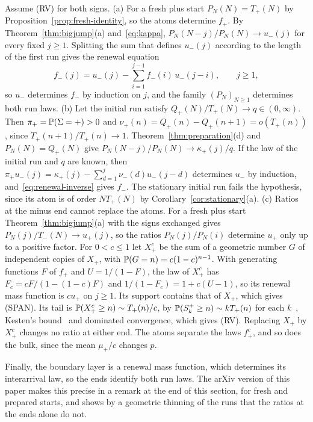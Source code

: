 \begin{remark}\label{thm:inverse}\label{rem:thinning}
Assume (RV) for both signs.
(a) For a fresh plus start $P_N(N)=T_\plus(N)$ by
Proposition~\ref{prop:fresh-identity}, so the atoms determine $f_\plus$. By
Theorem~\ref{thm:bigjump}(a) and~\eqref{eq:kappa}, $P_N(N-j)/P_N(N)\to u_\minus(j)$ for
every fixed $j\ge1$. Splitting the sum that defines $u_\minus(j)$ according to the
length of the first run gives the renewal equation
\begin{equation}\label{eq:renewal-inverse}
 f_\minus(j)=u_\minus(j)-\sum_{i=1}^{j-1}f_\minus(i)\,u_\minus(j-i),\qquad j\ge1,
\end{equation}
so $u_\minus$ determines $f_\minus$ by induction on $j$, and the family $(P_N)_{N\ge1}$
determines both run laws.
(b) Let the initial run satisfy $Q_\plus(N)/T_\plus(N)\to q\in(0,\infty)$. Then
$\pi_{+}=\mathbb{P}(\Sigma={+})>0$ and $\nu_\plus(n)=Q_\plus(n)-Q_\plus(n+1)=o(T_\plus(n))$,
since $T_\plus(n+1)/T_\plus(n)\to1$. Theorem~\ref{thm:preparation}(d) and
$P_N(N)=Q_\plus(N)$ give $P_N(N-j)/P_N(N)\to\kappa_\plus(j)/q$. If the law of the
initial run and $q$ are known, then
$\pi_\plus u_\minus(j)=\kappa_\plus(j)-\sum_{d=1}^{j}\nu_\minus(d)u_\minus(j-d)$ determines
$u_\minus$ by induction, and~\eqref{eq:renewal-inverse} gives $f_\minus$. The stationary
initial run fails the hypothesis, since its atom is of order $NT_\plus(N)$ by
Corollary~\ref{cor:stationary}(a).
(c) Ratios at the minus end cannot replace the atoms. For a fresh plus start
Theorem~\ref{thm:bigjump}(a) with the signs exchanged gives
$P_N(j)/T_\minus(N)\to u_\plus(j)$, so the ratios $P_N(j)/P_N(i)$ determine $u_\plus$
only up to a positive factor. For $0<c\le1$ let $X^c_\plus$ be the sum of a geometric
number $G$ of independent copies of $X_\plus$, with $\mathbb{P}(G=n)=c(1-c)^{n-1}$. With
generating functions $F$ of $f_\plus$ and $U=1/(1-F)$, the law of $X^c_\plus$ has
$F_c=cF/(1-(1-c)F)$ and $1/(1-F_c)=1+c(U-1)$, so its renewal mass function is
$cu_\plus$ on $j\ge1$. Its support contains that of $X_\plus$, which gives (SPAN). Its
tail is $\mathbb{P}(X^c_{+}\ge n)\sim T_{+}(n)/c$, by $\mathbb{P}(S^{+}_k\ge n)\sim kT_{+}(n)$
for each $k$~\cite[Theorem~2.1]{berger2019ptrf}, Kesten's
bound~\cite[Lemma~1.3.5]{ekm1997} and dominated convergence, which gives (RV).
Replacing $X_\plus$ by $X^c_\plus$ changes no ratio at either end. The atoms separate
the laws $f^c_\plus$, and so does the bulk, since the mean $\mu_\plus/c$ changes $p$.
\end{remark}
\else
Finally, the boundary layer is a renewal mass function, which determines its interarrival
law, so the ends identify both run laws. The arXiv version of this paper makes this precise
in a remark at the end of this section, for fresh and prepared starts, and shows by a
geometric thinning of the runs that the ratios at the ends alone do not.
\fi
